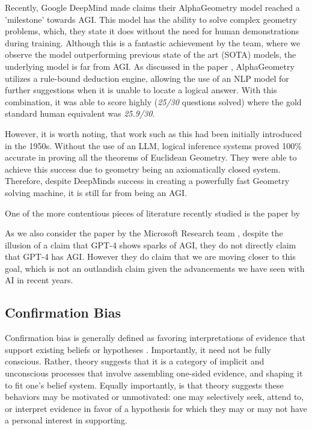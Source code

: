 \documentclass{article}
\theoremstyle{plain}
\theoremstyle{definition}
\theoremstyle{remark}
\begin{document}
Recently, Google DeepMind made claims their AlphaGeometry model reached a 'milestone' towards AGI. This model has the ability to solve complex geometry problems, which, they state it does without the need for human demonstrations during training. Although this is a fantastic achievement by the team, where we observe the model outperforming previous state of the art (SOTA) models, the underlying model is far from AGI. As discussed in the paper \cite{}, AlphaGeometry utilizes a rule-bound deduction engine, allowing the use of an NLP model for further suggestions when it is unable to locate a logical answer. With this combination, it was able to score highly (\textit{25/30} questions solved) where the gold standard human equivalent was \textit{25.9/30}.

However, it is worth noting, that work such as this had been initially introduced in the 1950s. Without the use of an LLM, logical inference systems proved 100\% accurate in proving all the theorems of Euclidean Geometry. They were able to achieve this success due to geometry being an axiomatically closed system. Therefore, despite DeepMinds success in creating a powerfully fast Geometry solving machine, it is still far from being an AGI.

One of the more contentious pieces of literature recently studied is the paper by \cite{gurnee2023language}

As we also consider the paper by the Microsoft Research team \cite{}, despite the illusion of a claim that GPT-4 shows sparks of AGI, they do not directly claim that GPT-4 has AGI. However they do claim that we are moving closer to this goal, which is not an outlandish claim given the advancements we have seen with AI in recent years.

\subsection{Confirmation Bias}

Confirmation bias is generally defined as favoring interpretations of evidence that support existing beliefs or hypotheses \cite{nickerson1998confirmation}. Importantly, it need not be fully conscious. Rather, theory suggests that it is a category of implicit and unconscious processes that involve assembling one-sided evidence, and shaping it to fit one's belief system. Equally importantly, is that theory suggests these behaviors may be motivated or unmotivated: one may selectively seek, attend to, or interpret evidence in favor of a hypothesis for which they may or may not have a personal interest in supporting. 
\end{document}
